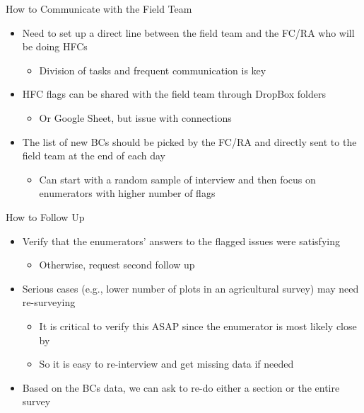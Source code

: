 \documentclass[aspectratio=169]{beamer}
\begin{document}
\begin{frame}{How to Communicate with the Field Team}
    
    \begin{itemize}
    \setlength\itemsep{2em}
        
        \vspace{1em}
        \item Need to set up a direct line between the field team and the FC/RA who will be doing HFCs
        \begin{itemize}
            \item Division of tasks and frequent communication is key
        \end{itemize}
        \item HFC flags can be shared with the field team through DropBox folders
        \begin{itemize}
            \item Or Google Sheet, but issue with connections
        \end{itemize}
        \item The list of new BCs should be picked by the FC/RA and directly sent to the field team at the end of each day
        \begin{itemize}
            \item Can start with a random sample of interview and then focus on enumerators with higher number of flags
        \end{itemize}
        
    \end{itemize}
    
\end{frame}

\begin{frame}{How to Follow Up}

    \begin{itemize}
        \setlength\itemsep{1.5em}
        \item Verify that the enumerators' answers to the flagged issues were satisfying
            \begin{itemize}
                \item Otherwise, request second follow up
            \end{itemize}
        
        \item Serious cases (e.g., lower number of plots in an agricultural survey) may need re-surveying
            \begin{itemize}
                \item It is critical to verify this ASAP since the enumerator is most likely close by
                \item So it is easy to re-interview and get missing data if needed
            \end{itemize}
            
        \item Based on the BCs data, we can ask to re-do either a section or the entire survey
        
    \end{itemize}

\end{frame}
\end{document}
